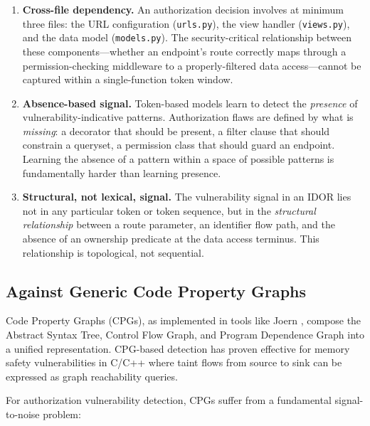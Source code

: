 \begin{enumerate}
    \item \textbf{Cross-file dependency.} An authorization decision involves at minimum three files: the URL configuration (\texttt{urls.py}), the view handler (\texttt{views.py}), and the data model (\texttt{models.py}). The security-critical relationship between these components—whether an endpoint's route correctly maps through a permission-checking middleware to a properly-filtered data access—cannot be captured within a single-function token window.

    \item \textbf{Absence-based signal.} Token-based models learn to detect the \emph{presence} of vulnerability-indicative patterns. Authorization flaws are defined by what is \emph{missing}: a decorator that should be present, a filter clause that should constrain a queryset, a permission class that should guard an endpoint. Learning the absence of a pattern within a space of possible patterns is fundamentally harder than learning presence.

    \item \textbf{Structural, not lexical, signal.} The vulnerability signal in an IDOR lies not in any particular token or token sequence, but in the \emph{structural relationship} between a route parameter, an identifier flow path, and the absence of an ownership predicate at the data access terminus. This relationship is topological, not sequential.
\end{enumerate}

\subsection{Against Generic Code Property Graphs}

Code Property Graphs (CPGs), as implemented in tools like Joern \cite{yamaguchi2014modeling}, compose the Abstract Syntax Tree, Control Flow Graph, and Program Dependence Graph into a unified representation. CPG-based detection has proven effective for memory safety vulnerabilities in C/C++ where taint flows from source to sink can be expressed as graph reachability queries.

For authorization vulnerability detection, CPGs suffer from a fundamental signal-to-noise problem:

